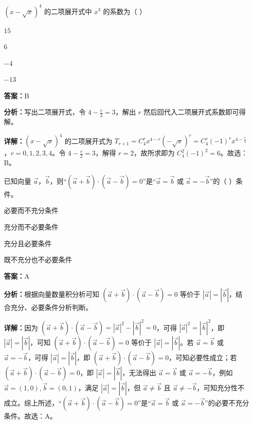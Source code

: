 \begin{question}[points=4]
$(x - \sqrt{x})^4$ 的二项展开式中 $x^3$ 的系数为（ ）
\begin{choices}
  \item $15$
  \item $6$
  \item $-4$
  \item $-13$
\end{choices}
\begin{solution}
\textbf{答案：}B

\textbf{分析：}写出二项展开式，令 $4-\frac{r}{2}=3$，解出 $r$ 然后回代入二项展开式系数即可得解。

\textbf{详解：}$(x - \sqrt{x})^4$ 的二项展开式为 $T_{r+1} = C_4^r x^{4-r} (-\sqrt{x})^r = C_4^r (-1)^r x^{4-\frac{r}{2}}$，$r=0,1,2,3,4$。令 $4-\frac{r}{2}=3$，解得 $r=2$，故所求即为 $C_4^2 (-1)^2 = 6$。故选：B。
\end{solution}
\end{question}

\begin{question}[points=4]
已知向量 $\vec{a}$，$\vec{b}$，则“$(\vec{a}+\vec{b})\cdot(\vec{a}-\vec{b})=0$”是“$\vec{a}=\vec{b}$ 或 $\vec{a}=-\vec{b}$”的（ ）条件。
\begin{choices}
  \item 必要而不充分条件
  \item 充分而不必要条件
  \item 充分且必要条件
  \item 既不充分也不必要条件
\end{choices}
\begin{solution}
\textbf{答案：}A

\textbf{分析：}根据向量数量积分析可知 $(\vec{a}+\vec{b})\cdot(\vec{a}-\vec{b})=0$ 等价于 $|\vec{a}|=|\vec{b}|$，结合充分、必要条件分析判断。

\textbf{详解：}因为 $(\vec{a}+\vec{b})\cdot(\vec{a}-\vec{b}) = |\vec{a}|^2-|\vec{b}|^2=0$，可得 $|\vec{a}|^2=|\vec{b}|^2$，即 $|\vec{a}|=|\vec{b}|$，可知 $(\vec{a}+\vec{b})\cdot(\vec{a}-\vec{b})=0$ 等价于 $|\vec{a}|=|\vec{b}|$。若 $\vec{a}=\vec{b}$ 或 $\vec{a}=-\vec{b}$，可得 $|\vec{a}|=|\vec{b}|$，即 $(\vec{a}+\vec{b})\cdot(\vec{a}-\vec{b})=0$，可知必要性成立；若 $(\vec{a}+\vec{b})\cdot(\vec{a}-\vec{b})=0$，即 $|\vec{a}|=|\vec{b}|$，无法得出 $\vec{a}=\vec{b}$ 或 $\vec{a}=-\vec{b}$，例如 $\vec{a}=(1,0),\vec{b}=(0,1)$，满足 $|\vec{a}|=|\vec{b}|$，但 $\vec{a}\neq\vec{b}$ 且 $\vec{a}\neq-\vec{b}$，可知充分性不成立。综上所述，“$(\vec{a}+\vec{b})\cdot(\vec{a}-\vec{b})=0$”是“$\vec{a}=\vec{b}$ 或 $\vec{a}=-\vec{b}$”的必要不充分条件。故选：A。
\end{solution}
\end{question}

